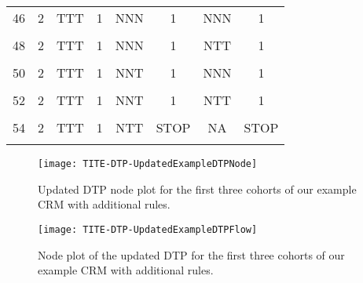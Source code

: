 \begin{table}[h!]
{\begin{tabular}[t]{cccccccc}
			46 & 2 & TTT & 1 & NNN & 1 & NNN & 1\\
			\cellcolor{gray!6}{47} & \cellcolor{gray!6}{2} & \cellcolor{gray!6}{TTT} & \cellcolor{gray!6}{1} & \cellcolor{gray!6}{NNN} & \cellcolor{gray!6}{1} & \cellcolor{gray!6}{NNT} & \cellcolor{gray!6}{1}\\
			48 & 2 & TTT & 1 & NNN & 1 & NTT & 1\\
			\cellcolor{gray!6}{49} & \cellcolor{gray!6}{2} & \cellcolor{gray!6}{TTT} & \cellcolor{gray!6}{1} & \cellcolor{gray!6}{NNN} & \cellcolor{gray!6}{1} & \cellcolor{gray!6}{TTT} & \cellcolor{gray!6}{1}\\
			50 & 2 & TTT & 1 & NNT & 1 & NNN & 1\\
			\cellcolor{gray!6}{51} & \cellcolor{gray!6}{2} & \cellcolor{gray!6}{TTT} & \cellcolor{gray!6}{1} & \cellcolor{gray!6}{NNT} & \cellcolor{gray!6}{1} & \cellcolor{gray!6}{NNT} & \cellcolor{gray!6}{1}\\
			52 & 2 & TTT & 1 & NNT & 1 & NTT & 1\\
			\cellcolor{gray!6}{53} & \cellcolor{gray!6}{2} & \cellcolor{gray!6}{TTT} & \cellcolor{gray!6}{1} & \cellcolor{gray!6}{NNT} & \cellcolor{gray!6}{1} & \cellcolor{gray!6}{TTT} & \cellcolor{gray!6}{STOP}\\
			54 & 2 & TTT & 1 & NTT & STOP & NA & STOP\\
			\cellcolor{gray!6}{55} & \cellcolor{gray!6}{2} & \cellcolor{gray!6}{TTT} & \cellcolor{gray!6}{1} & \cellcolor{gray!6}{TTT} & \cellcolor{gray!6}{STOP} & \cellcolor{gray!6}{NA} & \cellcolor{gray!6}{STOP}\\
			\bottomrule
	\end{tabular}}
\end{table}

\begin{figure}[h!]
	\centering
	\caption[Updated DTP node plot.]{Updated DTP node plot for the first three cohorts of our example CRM with additional rules.}
	\label{fig_tite-dtp:UpdatedDTPExampleNode}
	\texttt{[image: TITE-DTP-UpdatedExampleDTPNode]}
\end{figure}

\begin{figure}[h!]
	\centering
	\caption[Updated DTP flow plot.]{Node plot of the updated DTP for the first three cohorts of our example CRM with additional rules.}
	\label{fig_tite-dtp:UpdatedDTPExampleFlow}
	\texttt{[image: TITE-DTP-UpdatedExampleDTPFlow]}
\end{figure}


